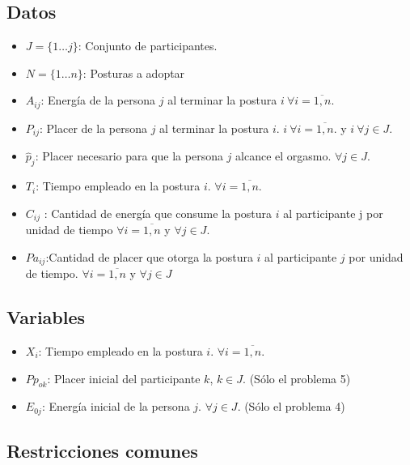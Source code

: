 \documentclass[12pt]{article}
\begin{document}
\subsection{Datos}
\begin{itemize}
    \item $J = \{1 \dots j\}$: Conjunto de participantes.
    \item $N = \{1 \dots n\}$: Posturas a adoptar
    \item $A_{ij}$: Energía de la persona $j$ al terminar la postura $i\  \forall i = \overline{1,n}$.
    \item $P_{ij}$: Placer de la persona $j$ al terminar la postura $i$. $i\  \forall i = \overline{1,n}$. y $i\  \forall j \in J$.
    \item $\widehat{p}_j$: Placer necesario para que la persona $j$ alcance el orgasmo. $\forall j \in J$.
    \item $T_i$: Tiempo empleado en la postura $i$. $\forall i = \overline{1,n}$.
    \item $C_{ij}$ : Cantidad de energía que consume la postura $i$ al participante j por unidad de tiempo $\forall i = \overline{1,n}$ y $\forall j \in J$.
    \item $Pa_{ij}$:Cantidad de placer que otorga la postura $i$ al participante $j$ por unidad de tiempo. $\forall i = \overline{1,n}$ y $\forall j \in J$
    
\end{itemize}

\subsection{Variables}
\begin{itemize}
    \item $X_i$: Tiempo empleado en la postura $i$. $\forall i = \overline{1,n}$.
    \item $Pp_{ok}$: Placer inicial del participante $k$, $k\in J$. (Sólo el problema 5)
    \item  $E_{0j}$: Energía inicial de la persona $j$. $\forall j \in J$. (Sólo el problema 4)
\end{itemize}

\subsection{Restricciones comunes}
\end{document}
